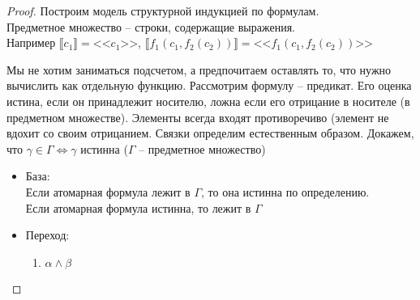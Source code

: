 \begin{proof}
Построим модель структурной индукцией по формулам.\\
Предметное множество -- строки, содержащие выражения.\\
Например $\llbracket c_1 \rrbracket = \text{<<$c_1$>>}$,
$\llbracket f_1 (c_1, f_2(c_2)) \rrbracket = \text{<<$f_1 (c_1, f_2(c_2))$>>}$

Мы не хотим заниматься подсчетом, а предпочитаем оставлять то, что нужно вычислить как отдельную функцию. Рассмотрим формулу -- предикат. Его оценка истина, если он принадлежит носителю, ложна если его отрицание в носителе (в предметном множестве). Элементы всегда входят противоречиво (элемент не вдохит со своим отрицанием. Связки определим естественным образом. Докажем, что $\gamma \in \Gamma \Leftrightarrow \gamma$ истинна ($\Gamma$ -- предметное множество)
\begin{itemize}
\item База:\\
Если атомарная формула лежит в $\Gamma$, то она истинна по определению.\\
Если атомарная формула истинна, то лежит в $\Gamma$
\item Переход:
\begin{enumerate}
\item $\alpha \land \beta$


\end{enumerate}
\end{itemize}
\end{proof}
